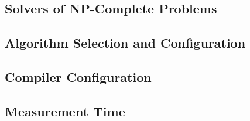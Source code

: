 \subsection{Solvers of NP-Complete Problems}
\label{subsec:np}

\subsection{Algorithm Selection and Configuration}
\label{subsec:algsel}

\subsection{Compiler Configuration}
\label{subsec:compilerconfig}

\subsection{Measurement Time}
\label{subsec:measure}
